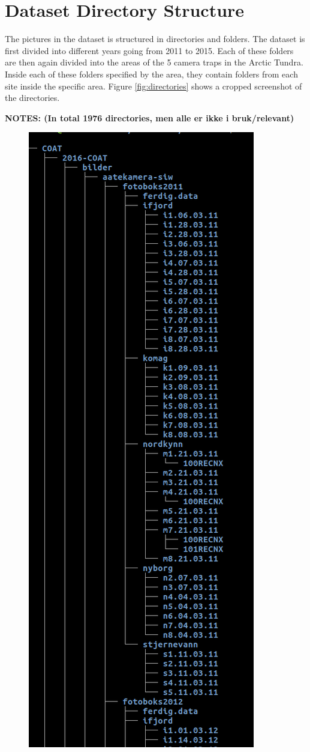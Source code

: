 \documentclass[USenglish]{uit-thesis}
\begin{document}
\section{Dataset Directory Structure}
The pictures in the dataset is structured in directories and folders. The dataset is first divided into different years going from 2011 to 2015. Each of these folders are then again divided into the areas of the 5 camera traps in the Arctic Tundra. Inside each of these folders specified by the area, they contain folders from each site inside the specific area.
Figure \ref{fig:directories} shows a cropped screenshot of the directories.

\textbf{NOTES: (In total 1976 directories, men alle er ikke i bruk/relevant)}

\begin{figure}
\centering
\includegraphics[scale=0.5]{directory.png}

\end{figure}
\end{document}
